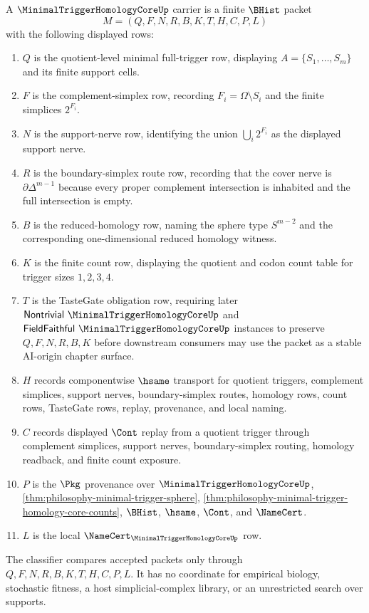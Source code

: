 \begin{definition}
\label{def:minimal-trigger-homology-core-carrier}
A $\MinimalTriggerHomologyCoreUp$ carrier is a finite $\BHist$ packet
$$
M=(Q,F,N,R,B,K,T,H,C,P,L)
$$
with the following displayed rows:
\begin{enumerate}
\item $Q$ is the quotient-level minimal full-trigger row, displaying $A=\{S_{1},\ldots,S_{m}\}$ and its finite support cells.
\item $F$ is the complement-simplex row, recording $F_i=\Omega\setminus S_i$ and the finite simplices $2^{F_i}$.
\item $N$ is the support-nerve row, identifying the union $\bigcup_i 2^{F_i}$ as the displayed support nerve.
\item $R$ is the boundary-simplex route row, recording that the cover nerve is $\partial\Delta^{m-1}$ because every proper complement intersection is inhabited and the full intersection is empty.
\item $B$ is the reduced-homology row, naming the sphere type $S^{m-2}$ and the corresponding one-dimensional reduced homology witness.
\item $K$ is the finite count row, displaying the quotient and codon count table for trigger sizes $1,2,3,4$.
\item $T$ is the TasteGate obligation row, requiring later $\mathsf{Nontrivial}\ \MinimalTriggerHomologyCoreUp$ and $\mathsf{FieldFaithful}\ \MinimalTriggerHomologyCoreUp$ instances to preserve $Q,F,N,R,B,K$ before downstream consumers may use the packet as a stable AI-origin chapter surface.
\item $H$ records componentwise $\hsame$ transport for quotient triggers, complement simplices, support nerves, boundary-simplex routes, homology rows, count rows, TasteGate rows, replay, provenance, and local naming.
\item $C$ records displayed $\Cont$ replay from a quotient trigger through complement simplices, support nerves, boundary-simplex routing, homology readback, and finite count exposure.
\item $P$ is the $\Pkg$ provenance over $\MinimalTriggerHomologyCoreUp$, \autoref{thm:philosophy-minimal-trigger-sphere}, \autoref{thm:philosophy-minimal-trigger-homology-core-counts}, $\BHist$, $\hsame$, $\Cont$, and $\NameCert$.
\item $L$ is the local $\NameCert_{\MinimalTriggerHomologyCoreUp}$ row.
\end{enumerate}
The classifier compares accepted packets only through $Q,F,N,R,B,K,T,H,C,P,L$. It has no coordinate for empirical biology, stochastic fitness, a host simplicial-complex library, or an unrestricted search over supports.
\end{definition}


